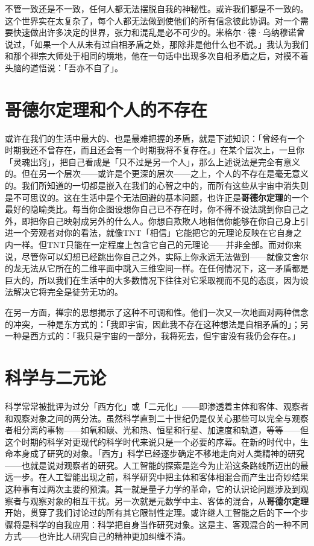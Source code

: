\documentclass[
  12pt,
  twoside,
  openright,
  oldfontcommands,
]{memoir}
\newcommand{\heititext}[1]{{\heifamily\bfseries #1}}
\begin{document}
不管一致还是不一致，任何人都无法摆脱自我的神秘性。或许我们都是不一致的。这个世界实在太复杂了，每个人都无法做到使他们的所有信念彼此协调。对一个需要快速做出许多决定的世界，张力和混乱是必不可少的。米格尔·德·乌纳穆诺曾说过，「如果一个人从未有过自相矛盾之处，那除非是他什么也不说。」我认为我们和那个禅宗大师处于相同的境地，他在一句话中出现多次自相矛盾之后，对摸不着头脑的道悟说：「吾亦不自了」。

\section{哥德尔定理和个人的不存在}

或许在我们的生活中最大的、也是最难把握的矛盾，就是下述知识：「曾经有一个时期我还不曾存在，而且还会有一个时期我将不复存在。」在某个层次上，一旦你「灵魂出窍」，把自己看成是「只不过是另一个人」，那么上述说法是完全有意义的。但在另一个层次------或许是个更深的层次------之上，个人的不存在是毫无意义的。我们所知道的一切都是嵌入在我们的心智之中的，而所有这些从宇宙中消失则是不可思议的。这在生活中是个无法回避的基本问题，也许正是\heititext{哥德尔定理}的一个最好的隐喻类比。每当你企图设想你自己已不存在时，你不得不设法跳到你自己之外，即把你自己映射成另外的什么人。你想自欺欺人地相信你能够在你自己身上引进一个旁观者对你的看法，就像TNT「相信」它能把它的元理论反映在它自身之内一样。但TNT只能在一定程度上包含它自己的元理论------并非全部。而对你来说，尽管你可以幻想已经跳出你自己之外，实际上你永远无法做到------就像艾舍尔的龙无法从它所在的二维平面中跳入三维空间一样。在任何情况下，这一矛盾都是巨大的，所以我们在生活中的大多数情况下往往对它采取视而不见的态度，因为设法解决它将完全是徒劳无功的。

在另一方面，禅宗的思想揭示了这种不可调和性。他们一次又一次地面对两种信念的冲突，一种是东方式的：「我即宇宙，因此我不存在这种想法是自相矛盾的」；另一种是西方式的：「我只是宇宙的一部分，我将死去，但宇宙没有我仍会存在。」

\section{科学与二元论}

科学常常被批评为过分「西方化」或「二元化」------即渗透着主体和客体、观察者和观察对象之间的两分法。虽然科学直到二十世纪仍是仅关心那些可以完全与观察者相分离的事物------如氧和碳、光和热、恒星和行星、加速度和轨道，等等------但这个时期的科学对更现代的科学时代来说只是一个必要的序幕。在新的时代中，生命本身成了研究的对象。「西方」科学已经逐步确定不移地走向对人类精神的研究------也就是说对观察者的研究。人工智能的探索是迄今为止沿这条路线所迈出的最远一步。在人工智能出现之前，科学研究中把主体和客体相混合而产生出奇妙结果这种事有过两次主要的预演。其一就是量子力学的革命，它的认识论问题涉及到观察者与观察对象的相互干扰。另一次就是元数学中主、客体的混合，从\heititext{哥德尔定理}开始，贯穿了我们讨论过的所有其它限制性定理。或许继人工智能之后的下一个步骤将是科学的自我应用：科学把自身当作研究对象。这是主、客观混合的一种不同方式------也许比人研究自己的精神更加纠缠不清。
\end{document}
